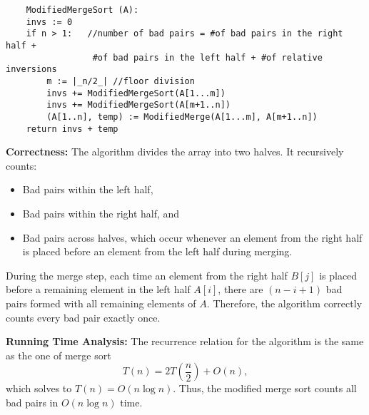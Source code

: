 \documentclass{article}
\begin{document}
\begin{enumerate}[label=\alph*)]
\begin{itemize}
\begin{verbatim}
    ModifiedMergeSort (A):
    invs := 0
    if n > 1:   //number of bad pairs = #of bad pairs in the right half + 
                 #of bad pairs in the left half + #of relative inversions
        m := |_n/2_| //floor division
        invs += ModifiedMergeSort(A[1...m])
        invs += ModifiedMergeSort(A[m+1..n])
        (A[1..n], temp) := ModifiedMerge(A[1...m], A[m+1..n])
    return invs + temp
  \end{verbatim}

  \textbf{Correctness:}  
  The algorithm divides the array into two halves.  
  It recursively counts:
  \begin{itemize}
      \item Bad pairs within the left half,
      \item Bad pairs within the right half, and
      \item Bad pairs across halves, which occur whenever an element from the right half is placed before an element from the left half during merging.
  \end{itemize}
  During the merge step, each time an element from the right half $B[j]$ is placed before a remaining element in the left half $A[i]$, there are $(n - i + 1)$ bad pairs formed with all remaining elements of $A$.  
  Therefore, the algorithm correctly counts every bad pair exactly once.

  \textbf{Running Time Analysis:}  
  The recurrence relation for the algorithm is the same as the one of merge sort 
  \[
  T(n) = 2T\left(\frac{n}{2}\right) + O(n),
  \]
  which solves to $T(n) = O(n \log n)$.  
  Thus, the modified merge sort counts all bad pairs in $O(n \log n)$ time.
\end{itemize}
\end{enumerate}
\end{document}
